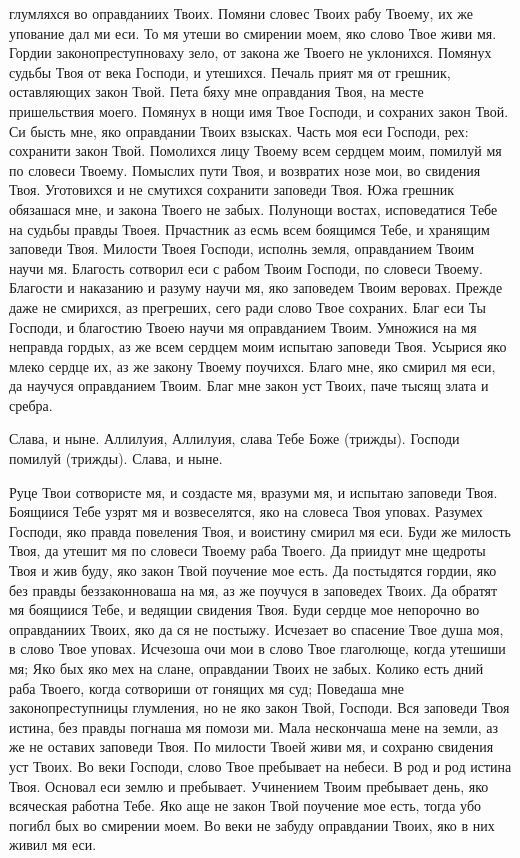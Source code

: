 глумляхся во оправданиих Твоих. Помяни словес Твоих рабу Твоему, их же упование дал ми еси. То мя утеши во смирении моем, яко слово Твое живи мя. Гордии законопреступноваху зело, от закона же Твоего не уклонихся. Помянух судьбы Твоя от века Господи, и утешихся. Печаль прият мя от грешник, оставляющих закон Твой. Пета бяху мне оправдания Твоя, на месте пришельствия моего. Помянух в нощи имя Твое Господи, и сохраних закон Твой. Си бысть мне, яко оправдании Твоих взысках. Часть моя еси Господи, рех: сохранити закон Твой. Помолихся лицу Твоему всем сердцем моим, помилуй мя по словеси Твоему. Помыслих пути Твоя, и возвратих нозе мои, во свидения Твоя. Уготовихся и не смутихся сохранити заповеди Твоя. Южа грешник обязашася мне, и закона Твоего не забых. Полунощи востах, исповедатися Тебе на судьбы правды Твоея. Прчастник аз есмь всем боящимся Тебе, и хранящим заповеди Твоя. Милости Твоея Господи, исполнь земля, оправданием Твоим научи мя. Благость сотворил еси с рабом Твоим Господи, по словеси Твоему. Благости и наказанию и разуму научи мя, яко заповедем Твоим веровах. Прежде даже не смирихся, аз прегреших, сего ради слово Твое сохраних. Благ еси Ты Господи, и благостию Твоею научи мя оправданием Твоим. Умножися на мя неправда гордых, аз же всем сердцем моим испытаю заповеди Твоя. Усырися яко млеко сердце их, аз же закону Твоему поучихся. Благо мне, яко смирил мя еси, да научуся оправданием Твоим. Благ мне закон уст Твоих, паче тысящ злата и сребра.


\medskip


Слава, и ныне. Аллилуия, Аллилуия, слава Тебе Боже (трижды). Господи помилуй (трижды). Слава, и ныне.


\medskip


Руце Твои сотвористе мя, и создасте мя, вразуми мя, и испытаю заповеди Твоя. Боящиися Тебе узрят мя и возвеселятся, яко на словеса Твоя уповах. Разумех Господи, яко правда повеления Твоя, и воистину смирил мя еси. Буди же милость Твоя, да утешит мя по словеси Твоему раба Твоего. Да приидут мне щедроты Твоя и жив буду, яко закон Твой поучение мое есть. Да постыдятся гордии, яко без правды беззаконноваша на мя, аз же поучуся в заповедех Твоих. Да обратят мя боящиися Тебе, и ведящии свидения Твоя. Буди сердце мое непорочно во оправданиих Твоих, яко да ся не постыжу. Исчезает во спасение Твое душа моя, в слово Твое уповах. Исчезоша очи мои в слово Твое глаголюще, когда утешиши мя; Яко бых яко мех на слане, оправдании Твоих не забых. Колико есть дний раба Твоего, когда сотвориши от гонящих мя суд; Поведаша мне законопреступницы глумления, но не яко закон Твой, Господи. Вся заповеди Твоя истина, без правды погнаша мя помози ми. Мала нескончаша мене на земли, аз же не оставих заповеди Твоя. По милости Твоей живи мя, и сохраню свидения уст Твоих. Во веки Господи, слово Твое пребывает на небеси. В род и род истина Твоя. Основал еси землю и пребывает. Учинением Твоим пребывает день, яко всяческая работна Тебе. Яко аще не закон Твой поучение мое есть, тогда убо погибл бых во смирении моем. Во веки не забуду оправдании Твоих, яко в них живил мя еси.

